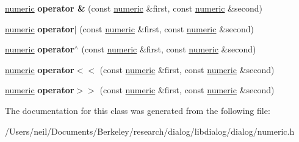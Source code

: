 \begin{DoxyCompactItemize}
\hyperlink{classdialog_1_1numeric}{numeric} {\bfseries operator \&} (const \hyperlink{classdialog_1_1numeric}{numeric} \&first, const \hyperlink{classdialog_1_1numeric}{numeric} \&second)
\item 
\mbox{\label{classdialog_1_1numeric_afd94615874c956110ed5576aabedd5cc}} 
\hyperlink{classdialog_1_1numeric}{numeric} {\bfseries operator$\vert$} (const \hyperlink{classdialog_1_1numeric}{numeric} \&first, const \hyperlink{classdialog_1_1numeric}{numeric} \&second)
\item 
\mbox{\label{classdialog_1_1numeric_a6b52c0e9d7ca155c15fe2274d97a2ad5}} 
\hyperlink{classdialog_1_1numeric}{numeric} {\bfseries operator$^\wedge$} (const \hyperlink{classdialog_1_1numeric}{numeric} \&first, const \hyperlink{classdialog_1_1numeric}{numeric} \&second)
\item 
\mbox{\label{classdialog_1_1numeric_a46628b5914ca57f6059b6e40d61a8617}} 
\hyperlink{classdialog_1_1numeric}{numeric} {\bfseries operator$<$$<$} (const \hyperlink{classdialog_1_1numeric}{numeric} \&first, const \hyperlink{classdialog_1_1numeric}{numeric} \&second)
\item 
\mbox{\label{classdialog_1_1numeric_a9a4d95dc2dd6557f8079f6b6b3a6ad1d}} 
\hyperlink{classdialog_1_1numeric}{numeric} {\bfseries operator$>$$>$} (const \hyperlink{classdialog_1_1numeric}{numeric} \&first, const \hyperlink{classdialog_1_1numeric}{numeric} \&second)
\end{DoxyCompactItemize}


The documentation for this class was generated from the following file\+:\begin{DoxyCompactItemize}
\item 
/\+Users/neil/\+Documents/\+Berkeley/research/dialog/libdialog/dialog/numeric.\+h\end{DoxyCompactItemize}
